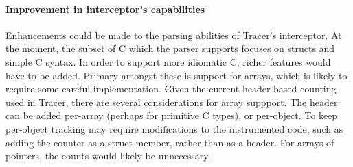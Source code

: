 \paragraph{Improvement in interceptor's capabilities}
Enhancements could be made to the parsing abilities of Tracer's interceptor. At the moment, the subset of C which the parser supports focuses on structs and simple C syntax. In order to support more idiomatic C, richer features would have to be added. Primary amongst these is support for arrays, which is likely to require some careful implementation. Given the current header-based counting used in Tracer, there are several considerations for array suppport. The header can be added per-array (perhaps for primitive C types), or per-object. To keep per-object tracking may require modifications to the instrumented code, such as adding the counter as a struct member, rather than as a header. For arrays of pointers, the counts would likely be unnecessary.
